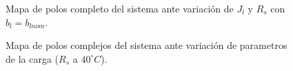 \documentclass[a4paper, 10pt, onecolumn,journal]{ieeeconf}
\begin{document}
\begin{figure}[H]
	\centering
	\begin{adjustbox}{scale=0.7,max width=\columnwidth}
	\end{adjustbox}
	\caption{Mapa de polos completo del sistema ante variación de $J_l$ y $R_s$ con $b_l = b_{lnom}$.}
	\label{mapa de polos b_l nominal}
\end{figure}

\begin{figure}[H]
	\centering
	\begin{adjustbox}{scale=0.5,max width=\columnwidth}
	\end{adjustbox}
	\caption{Mapa de polos complejos del sistema ante variación de parametros de la carga ($R_s$ a $40^\circ C$).}
	\label{mapa de polos complejos}
\end{figure}
\end{document}

